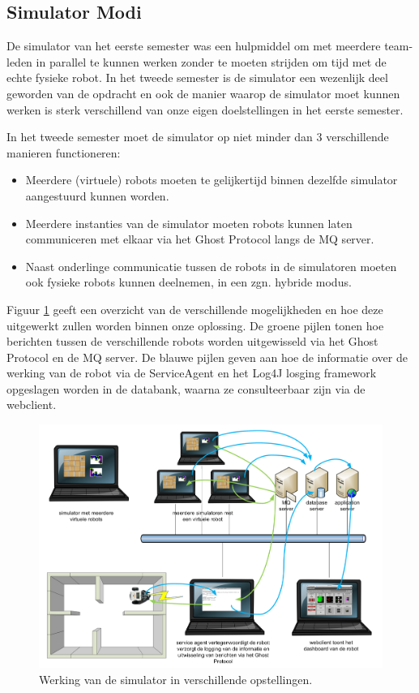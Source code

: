 \documentclass[12pt,a4paper]{report}
\begin{document}
\subsection{Simulator Modi}

De simulator van het eerste semester was een hulpmiddel om met meerdere team-leden in parallel te kunnen werken zonder te moeten strijden om tijd met de echte fysieke robot. In het tweede semester is de simulator een wezenlijk deel geworden van de opdracht en ook de manier waarop de simulator moet kunnen werken is sterk verschillend van onze eigen doelstellingen in het eerste semester.

In het tweede semester moet de simulator op niet minder dan 3 verschillende manieren functioneren:

\begin{itemize}
\item Meerdere (virtuele) robots moeten te gelijkertijd binnen dezelfde simulator aangestuurd kunnen worden.
\item Meerdere instanties van de simulator moeten robots kunnen laten communiceren met elkaar via het Ghost Protocol langs de MQ server.
\item Naast onderlinge communicatie tussen de robots in de simulatoren moeten ook fysieke robots kunnen deelnemen, in een zgn. hybride modus.
\end{itemize}

Figuur \ref{fig:simulator-modi} geeft een overzicht van de verschillende mogelijkheden en hoe deze uitgewerkt zullen worden binnen onze oplossing. De groene pijlen tonen hoe berichten tussen de verschillende robots worden uitgewisseld via het Ghost Protocol en de MQ server. De blauwe pijlen geven aan hoe de informatie over de werking van de robot via de ServiceAgent en het Log4J losging framework opgeslagen worden in de databank, waarna ze consulteerbaar zijn via de webclient.

\begin{figure}[htbp]
  \centering
  \includegraphics[width=200mm, angle=90]{resources/simulator-modi.png}
  \caption{Werking van de simulator in verschillende opstellingen.}
  \label{fig:simulator-modi}
\end{figure}
\end{document}
